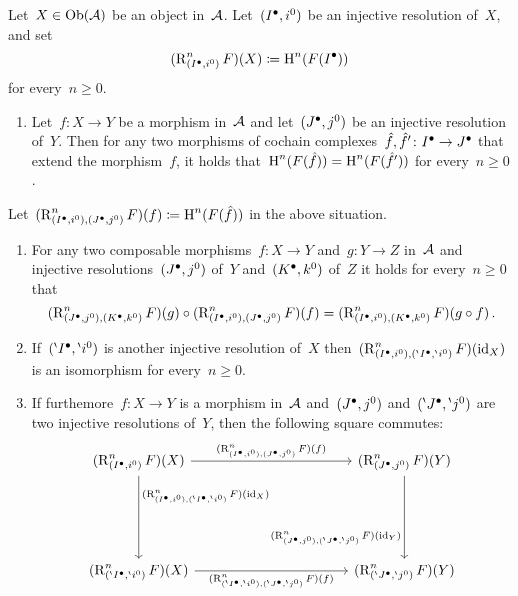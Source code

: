\begin{lemma}
  Let~$X \in \operatorname{Ob}(\mathcal{A})$ be an object in~$\mathcal{A}$.
  Let~$(I^\bullet, i^0)$ be an injective resolution of~$X$, and set
  \[
    (\operatorname{R}^n_{(I^\bullet,i^0)}F)(X)
    \coloneqq
    \operatorname{H}^n( F(I^\bullet) )
  \]
  for every~$n \geq 0$.
  \begin{enumerate}
    \item
      Let~$f \colon X \to Y$ be a morphism in~$\mathcal{A}$ and let~$(J^\bullet, j^0)$ be an injective resolution of~$Y$.
      Then for any two morphisms of cochain complexes~$\hat{f}, \hat{f}' \colon I^\bullet \to J^\bullet$ that extend the morphism~$f$, it holds that~$\operatorname{H}^n(F(\hat{f})) = \operatorname{H}^n(F(\hat{f}'))$  for every~$n \geq 0$.
  \end{enumerate}
  Let~$(\operatorname{R}^n_{(I^\bullet,i^0), (J^\bullet,j^0)} F)(f) \coloneqq \operatorname{H}^n(F(\hat{f}))$ in the above situation.
  \begin{enumerate}[resume]
    \item
      \label{functoriality of morphism between derived functors}
      For any two composable morphisms~$f \colon X \to Y$ and~$g \colon Y \to Z$ in~$\mathcal{A}$ and injective resolutions~$(J^\bullet, j^0)$ of~$Y$ and~$(K^\bullet,k^0)$ of~$Z$ it holds for every~$n \geq 0$ that
      \[
        (\operatorname{R}^n_{(J^\bullet,j^0), (K^\bullet,k^0)} F)(g)
        \circ
        (\operatorname{R}^n_{(I^\bullet,i^0), (J^\bullet,j^0)} F)(f)
        =
        (\operatorname{R}^n_{(I^\bullet,i^0), (K^\bullet,k^0)} F)(g \circ f)  \,.
      \]
    \item
      If~$({}^{\backprime}I^\bullet, {}^{\backprime} i^0)$ is another injective resolution of~$X$ then~$(\operatorname{R}^n_{(I^\bullet,i^0), ({}^{\backprime}I^\bullet, {}^{\backprime} i^0)} F)(\operatorname{id}_X)$ is an isomorphism for every~$n \geq 0$.
    \item
      If furthemore~$f \colon X \to Y$ is a morphism in~$\mathcal{A}$  and~$(J^\bullet, j^0)$ and~$({}^{\backprime}J^\bullet, {}^{\backprime} j^0)$ are two injective resolutions of~$Y$, then the following square commutes:
      \[
        \begin{tikzcd}[column sep = 11em, row sep = 6em]
            (\Right^n_{(\Iccc,i^0)} F)(X)
            \arrow{r}[above]{ (\Right^n_{(\Iccc,i^0), (\Jccc,j^0)} F)(f) }
            \arrow{d}[right, near start]{ (\Right^n_{(\Iccc,i^0), (\bp\Iccc, \bp i^0)} F)(\id_X) }
          & (\Right^n_{(\Jccc,j^0)} F)(Y)
            \arrow{d}[left, near end]{ (\Right^n_{(\Jccc,j^0), (\bp\Jccc, \bp j^0)} F)(\id_Y) }
          \\          
            (\Right^n_{(\bp\Iccc, \bp i^0)} F)(X)
            \arrow{r}[below]{ (\Right^n_{(\bp\Iccc, \bp i^0), (\bp\Jccc, \bp j^0)} F)(f) }
          & (\Right^n_{(\bp \Jccc, \bp j^0)} F)(Y)
        \end{tikzcd}
      \]
  \end{enumerate}
\end{lemma}


